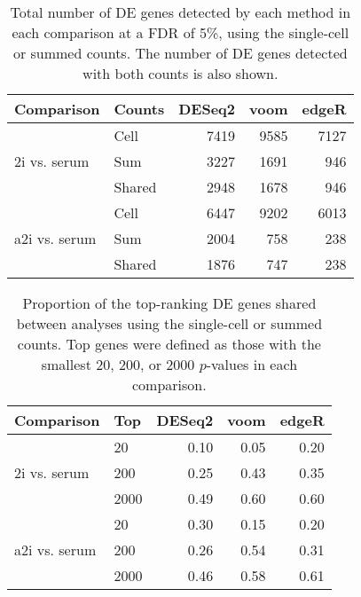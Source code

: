 \documentclass[oupdraft]{bio}
\begin{document}

\begin{table}[!p]
\caption{Total number of DE genes detected by each method in each comparison at a FDR of 5\%, using the single-cell or summed counts.
The number of DE genes detected with both counts is also shown.
}
\label{tab:realnum}
\begin{center}
\begin{tabular}{l l r r r}
\hline
\textbf{Comparison} & \textbf{Counts} & \textbf{DESeq2} & \textbf{voom} & \textbf{edgeR} \\
\hline
\multirow{3}{*}{2i vs. serum} 
& Cell & 7419 & 9585 & 7127 \\
& Sum & 3227 & 1691 & 946 \\
& Shared & 2948 & 1678 & 946 \\
\hline
\multirow{3}{*}{a2i vs. serum} 
& Cell & 6447 & 9202 & 6013 \\
& Sum & 2004 & 758 & 238 \\
& Shared & 1876 & 747 & 238 \\
\hline
\end{tabular}
\end{center}
\end{table}

\begin{table}[!p]
\caption{Proportion of the top-ranking DE genes shared between analyses using the single-cell or summed counts.
Top genes were defined as those with the smallest 20, 200, or 2000 $p$-values in each comparison.
}
\label{tab:realrank}
\begin{center}
\begin{tabular}{l l r r r}
\hline
\textbf{Comparison} & \textbf{Top} & \textbf{DESeq2} & \textbf{voom} & \textbf{edgeR} \\
\hline
\multirow{3}{*}{2i vs. serum} 
& 20 & 0.10 & 0.05 & 0.20 \\
& 200 & 0.25 & 0.43 & 0.35 \\
& 2000 & 0.49 & 0.60 & 0.60 \\
\hline
\multirow{3}{*}{a2i vs. serum} 
& 20 & 0.30 & 0.15 & 0.20 \\
& 200 & 0.26 & 0.54 & 0.31 \\
& 2000 & 0.46 & 0.58 & 0.61 \\
\hline
\end{tabular}
\end{center}
\end{table}
\end{document}
